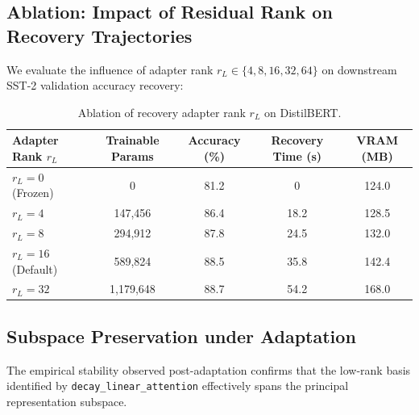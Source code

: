 \subsection{Ablation: Impact of Residual Rank on Recovery Trajectories}
We evaluate the influence of adapter rank $r_L \in \{4, 8, 16, 32, 64\}$ on downstream SST-2 validation accuracy recovery:
\begin{table}[H]
\centering
\small
\begin{tabularx}{\linewidth}{lcccc}
\toprule
\textbf{Adapter Rank $r_L$} & \textbf{Trainable Params} & \textbf{Accuracy (\%)} & \textbf{Recovery Time (s)} & \textbf{VRAM (MB)} \\
\midrule
$r_L = 0$ (Frozen) & 0 & 81.2 & 0 & 124.0 \\
$r_L = 4$ & 147,456 & 86.4 & 18.2 & 128.5 \\
$r_L = 8$ & 294,912 & 87.8 & 24.5 & 132.0 \\
$r_L = 16$ (Default) & 589,824 & 88.5 & 35.8 & 142.4 \\
$r_L = 32$ & 1,179,648 & 88.7 & 54.2 & 168.0 \\
\bottomrule
\end{tabularx}
\caption{Ablation of recovery adapter rank $r_L$ on DistilBERT.}
\label{tab:ablation_adapter_rank}
\end{table}

\subsection{Subspace Preservation under Adaptation}
The empirical stability observed post-adaptation confirms that the low-rank basis identified by \texttt{decay\_linear\_attention} effectively spans the principal representation subspace.
